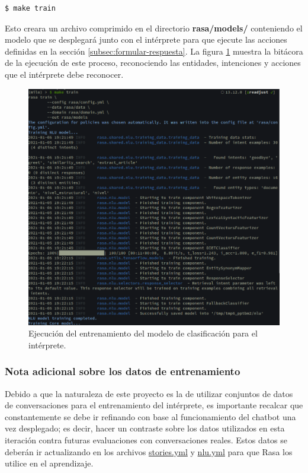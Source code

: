 \begin{lstlisting}[language=bash]
  $ make train
\end{lstlisting}

Esto creara un archivo comprimido en el directorio \textbf{rasa/models/} conteniendo el modelo que se desplegará junto con el intérprete para que ejecute las acciones definidas en la sección \ref{subsec:formular-respuesta}. La figura \ref{fig:entrenamiento} muestra la bitácora de la ejecución de este proceso, reconociendo las entidades, intenciones y acciones que el intérprete debe reconocer.

\begin{figure}
    \centering
    \includegraphics[scale=0.47]{images/6/training}
    \caption{Ejecución del entrenamiento del modelo de clasificación para el intérprete.}
    \label{fig:entrenamiento}
\end{figure}

\subsubsection{Nota adicional sobre los datos de entrenamiento}

Debido a que la naturaleza de este proyecto es la de utilizar conjuntos de datos de conversaciones para el entrenamiento del intérprete, es importante recalcar que constantemente se debe ir refinando con base al funcionamiento del chatbot una vez desplegado; es decir, hacer un contraste sobre los datos utilizados en esta iteración contra futuras evaluaciones con conversaciones reales. Estos datos se deberán ir actualizando en los archivos \href{https://github.com/AranGarcia/milo-bot/blob/master/rasa/data/stories.yml}{stories.yml} y \href{https://github.com/AranGarcia/milo-bot/blob/master/rasa/data/nlu.yml}{nlu.yml} para que Rasa los utilice en el aprendizaje.

